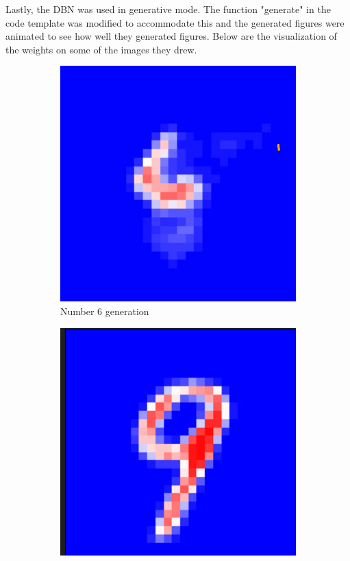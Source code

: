\documentclass[a4paper]{article}
\begin{document}
Lastly, the DBN was used in generative mode. The function "generate" in the code template was modified to accommodate this and the generated figures were animated to see how well they generated figures. Below are the visualization of the weights on some of the images they drew.

\begin{figure}[htb]
    \centering
    \begin{subfigure}[b]{0.32\textwidth}
        \centering
        \includegraphics[width=\textwidth]{Labs/Lab 4/Rakin/6_gif_img.png}
        \caption{Number 6 generation}
        \label{fig:number6gen}
    \end{subfigure}
    \begin{subfigure}[b]{0.32\textwidth}
        \centering
        \includegraphics[width=\textwidth]{Labs/Lab 4/Rakin/9_gif_img.png}

\end{subfigure}
\end{figure}
\end{document}
